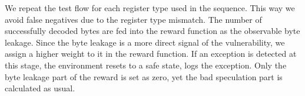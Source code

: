 We repeat the test flow for each register type used in the sequence. This way we avoid false negatives due to the register type mismatch.
The number of successfully decoded bytes are fed into the reward function as the observable byte leakage. Since the byte leakage is a more direct signal of the vulnerability, we assign a higher weight to it in the reward function.
If an exception is detected at this stage, the environment resets to a safe state, logs the exception. Only the byte leakage part of the reward is set as zero, yet the bad speculation part is calculated as usual. 

